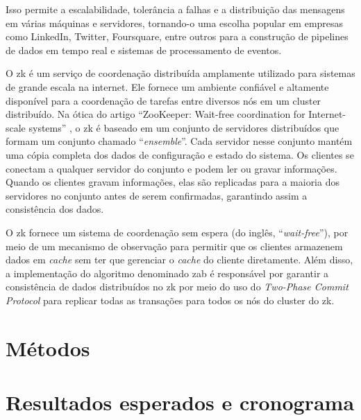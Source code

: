 Isso permite a escalabilidade, tolerância a falhas e a distribuição das mensagens em várias máquinas e servidores, tornando-o uma escolha popular em empresas como LinkedIn, Twitter, Foursquare, entre outros para a construção de pipelines de dados em tempo real e sistemas de processamento de eventos.

O \gls{zk} \cite{ZookeeperGitHub} é um serviço de coordenação distribuída amplamente utilizado para sistemas de grande escala na internet. Ele fornece um ambiente confiável e altamente disponível para a coordenação de tarefas entre diversos nós em um cluster distribuído. Na ótica do artigo ``ZooKeeper: Wait-free coordination for Internet-scale systems'' \cite{ZooKeeperWaitFree:2010}, o \gls{zk} é baseado em um conjunto de servidores distribuídos que formam um conjunto chamado ``\textit{ensemble}''. Cada servidor nesse conjunto mantém uma cópia completa dos dados de configuração e estado do sistema. Os clientes se conectam a qualquer servidor do conjunto e podem ler ou gravar informações. Quando os clientes gravam informações, elas são replicadas para a maioria dos servidores no conjunto antes de serem confirmadas, garantindo assim a consistência dos dados. 

O \gls{zk} fornece um sistema de coordenação sem espera (do inglês, ``\textit{wait-free}''), por meio de um mecanismo de observação para permitir que os clientes armazenem dados em \textit{cache} sem ter que gerenciar o \textit{cache} do cliente diretamente. Além disso, a implementação do algoritmo denominado \gls{zab} é responsável por garantir a consistência de dados distribuídos no \gls{zk} por meio do uso do \textit{Two-Phase Commit Protocol} para replicar todas as transações para todos os nós do cluster do \gls{zk}\cite{CloudKarafkaZAB}.

\section{Métodos}\label{sec:metodo}

\section{Resultados esperados e cronograma}

